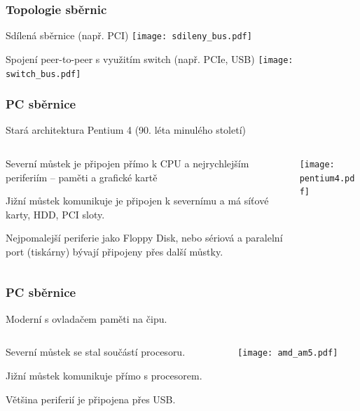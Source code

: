 \documentclass{beamer}
\begin{document}
\begin{frame}
\frametitle{Topologie sběrnic}
\begin{center}
Sdílená sběrnice (např. PCI)
\texttt{[image: sdileny\_bus.pdf]}
\end{center}

\begin{center}
Spojení peer-to-peer s využitím switch (např. PCIe, USB)
\texttt{[image: switch\_bus.pdf]}
\end{center}
\end{frame}

\begin{frame}
\frametitle{PC sběrnice}
\begin{center}
Stará architektura Pentium 4 (90. léta minulého století)
\end{center}

\begin{columns}
\begin{column}{0.5\textwidth}
Severní můstek je připojen přímo k CPU a nejrychlejším periferiím -- paměti a grafické kartě
\bigskip

Jižní můstek komunikuje je připojen k severnímu a má síťové karty, HDD, PCI sloty.

\bigskip
Nejpomalejší periferie jako Floppy Disk, nebo sériová a paralelní port (tiskárny) bývají připojeny přes další můstky.
\end{column}
\begin{column}{0.5\textwidth}  
\texttt{[image: pentium4.pdf]}
\end{column}
\end{columns}
\end{frame}

\begin{frame}
\frametitle{PC sběrnice}

\begin{center}
Moderní s ovladačem paměti na čipu.
\end{center}

\begin{columns}
\begin{column}{0.4\textwidth}
Severní můstek se stal součástí procesoru.

\bigskip
Jižní můstek komunikuje přímo s procesorem.

\bigskip
Většina periferií je připojena přes USB.
\end{column}
\begin{column}{0.6\textwidth}  
\texttt{[image: amd\_am5.pdf]}
\end{column}
\end{columns}
\end{frame}
\end{document}
